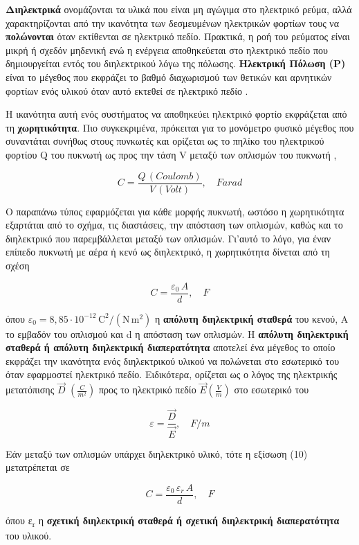 \textbf{Διηλεκτρικά} ονομάζονται τα υλικά που είναι μη αγώγιμα στο
ηλεκτρικό ρεύμα, αλλά χαρακτηρίζονται από την ικανότητα των δεσμευμένων
ηλεκτρικών φορτίων τους να \textbf{πολώνονται} όταν εκτίθενται σε
ηλεκτρικό πεδίο. Πρακτικά, η ροή του ρεύματος είναι μικρή ή σχεδόν
μηδενική ενώ η ενέργεια αποθηκεύεται στο ηλεκτρικό πεδίο που
δημιουργείται εντός του διηλεκτρικού λόγω της πόλωσης. \textbf{Ηλεκτρική
Πόλωση (P)} είναι το μέγεθος που εκφράζει το βαθμό διαχωρισμού των
θετικών και αρνητικών φορτίων ενός υλικού όταν αυτό εκτεθεί σε ηλεκτρικό
πεδίο \cite{ref17}.

Η ικανότητα αυτή ενός συστήματος να αποθηκεύει ηλεκτρικό φορτίο
εκφράζεται από τη \textbf{χωρητικότητα}. Πιο συγκεκριμένα, πρόκειται για
το μονόμετρο φυσικό μέγεθος που συναντάται συνήθως στους πυνκωτές και
ορίζεται ως το πηλίκο του ηλεκτρικού φορτίου Q του πυκνωτή ως προς την
τάση V μεταξύ των οπλισμών του πυκνωτή \cite{ref15},

\[C = \frac{Q\,(Coulomb)}{V\,(Volt)},\quad Farad \tag{2.12}\]

Ο παραπάνω τύπος εφαρμόζεται για κάθε μορφής πυκνωτή, ωστόσο η
χωρητικότητα εξαρτάται από το σχήμα, τις διαστάσεις, την απόσταση των
οπλισμών, καθώς και το διηλεκτρικό που παρεμβάλλεται μεταξύ των
οπλισμών. Γι'αυτό το λόγο, για έναν επίπεδο πυκνωτή με αέρα ή κενό ως
διηλεκτρικό, η χωρητικότητα δίνεται από τη σχέση \cite{ref28}

\[C = \frac{\varepsilon_{0}\, A}{d},\quad F \tag{2.13}\]

όπου $\varepsilon_{0}=8{,}85\cdot 10^{-12}\,\mathrm{C^2/(N\,m^2)}$ η \textbf{απόλυτη
διηλεκτρική σταθερά} του κενού, Α το εμβαδόν του οπλισμού και d η
απόσταση των οπλισμών. Η \textbf{απόλυτη διηλεκτρική σταθερά ή απόλυτη
διηλεκτρική διαπερατότητα} αποτελεί ένα μέγεθος το οποίο εκφράζει την
ικανότητα ενός διηλεκτρικού υλικού να πολώνεται στο εσωτερικό του όταν
εφαρμοστεί ηλεκτρικό πεδίο. Ειδικότερα, ορίζεται ως ο λόγος της
ηλεκτρικής μετατόπισης \(\overrightarrow{D}\)
\(\left( \frac{C}{m^{2}} \right)\) προς το ηλεκτρικό πεδίο
\(\overrightarrow{E}\left( \frac{V}{m} \right)\) στο εσωτερικό του
\cite{ref16}

\[\varepsilon = \frac{\overrightarrow{D}}{\overrightarrow{E}},\quad F/m \tag{2.14}\]

Εάν μεταξύ των οπλισμών υπάρχει διηλεκτρικό υλικό, τότε η εξίσωση (10)
μετατρέπεται σε \cite{ref15,ref28}

\[C = \frac{\varepsilon_{0}\,\varepsilon_{r}\, A}{d},\quad F \tag{2.15}\]

όπου ε\textsubscript{r} η \textbf{σχετική διηλεκτρική σταθερά ή σχετική
διηλεκτρική διαπερατότητα} του υλικού.

